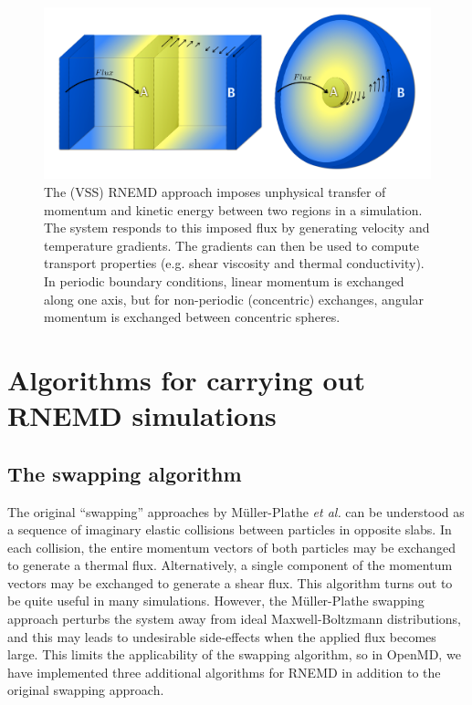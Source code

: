 \documentclass[letterpaper]{report}
\begin{document}
\begin{figure}
\includegraphics[width=\linewidth]{VSS2}
\caption[Illustration of energy exchange in the VSS RNEMD method]{The
  (VSS) RNEMD approach imposes unphysical transfer of momentum and
  kinetic energy between two regions in a simulation. The system
  responds to this imposed flux by generating velocity and temperature
  gradients. The gradients can then be used to compute transport
  properties (e.g. shear viscosity and thermal conductivity). In
  periodic boundary conditions, linear momentum is exchanged along one
  axis, but for non-periodic (concentric) exchanges, angular momentum
  is exchanged between concentric spheres.}
\label{rnemdDemo}
\end{figure}

\section{\label{section:algo}Algorithms for carrying out RNEMD simulations}
\subsection{\label{subsection:swapping}The swapping algorithm}
The original ``swapping'' approaches by M\"{u}ller-Plathe {\it et
  al.}\cite{ISI:000080382700030,MullerPlathe:1997xw} can be understood
as a sequence of imaginary elastic collisions between particles in
opposite slabs.  In each collision, the entire momentum vectors of
both particles may be exchanged to generate a thermal
flux. Alternatively, a single component of the momentum vectors may be
exchanged to generate a shear flux.  This algorithm turns out to be
quite useful in many simulations. However, the M\"{u}ller-Plathe
swapping approach perturbs the system away from ideal
Maxwell-Boltzmann distributions, and this may leads to undesirable
side-effects when the applied flux becomes large.\cite{Maginn:2010}
This limits the applicability of the swapping algorithm, so in OpenMD,
we have implemented three additional algorithms for RNEMD in addition to the
original swapping approach.
\end{document}
